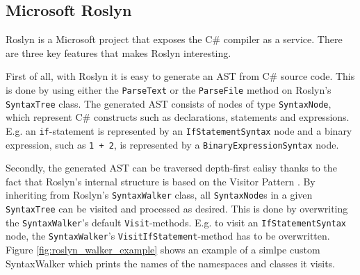\subsection{Microsoft Roslyn} %
\label{sub:microsoft_roslyn}
	Roslyn is a Microsoft project that exposes the C\# compiler as a service. There are three key features that makes Roslyn interesting.

	First of all, with Roslyn it is easy to generate an AST from C\# source code. This is done by using either the \texttt{ParseText} or the \texttt{ParseFile} method on Roslyn's \texttt{SyntaxTree} class. The generated AST consists of nodes of type \texttt{SyntaxNode}, which represent C\# constructs such as declarations, statements and expressions. E.g. an \texttt{if}-statement is represented by an \texttt{IfStatementSyntax} node and a binary expression, such as \texttt{1 + 2}, is represented by a \texttt{BinaryExpressionSyntax} node.

	Secondly, the generated AST can be traversed depth-first ealisy thanks to the fact that Roslyn's internal structure is based on the Visitor Pattern \cite{bib:visitorpattern}. By inheriting from Roslyn's \texttt{SyntaxWalker} class, all \texttt{SyntaxNode}s in a given \texttt{SyntaxTree} can be visited and processed as desired. This is done by overwriting the \texttt{SyntaxWalker}'s default \texttt{Visit}-methods. E.g. to visit an \texttt{IfStatementSyntax} node, the \texttt{SyntaxWalker}'s \texttt{VisitIfStatement}-method has to be overwritten. Figure \ref{fig:roslyn_walker_example} shows an example of a simlpe custom SyntaxWalker which prints the names of the namespaces and classes it visits.

